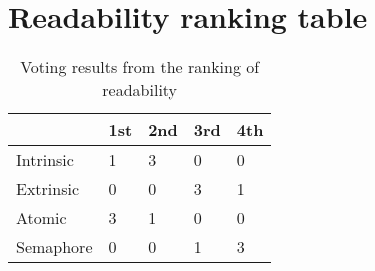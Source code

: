 \documentclass[11pt]{article}
\begin{document}
\section{Readability ranking table}

\begin{table}[H]
\centering
\caption{Voting results from the ranking of readability}
\label{tab:my-table}
\begin{tabular}{|l|l|l|l|l|}
\hline
          & 1st & 2nd & 3rd & 4th \\ \hline
Intrinsic & 1   & 3   & 0   & 0   \\ \hline
Extrinsic & 0   & 0   & 3   & 1   \\ \hline
Atomic    & 3   & 1   & 0   & 0   \\ \hline
Semaphore & 0   & 0   & 1   & 3   \\ \hline
\end{tabular}
\end{table}
\end{document}
